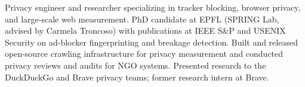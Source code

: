 

\begin{cvparagraph}

Privacy engineer and researcher specializing in tracker blocking, browser privacy, and large-scale web measurement. PhD candidate at EPFL (SPRING Lab, advised by Carmela Troncoso) with publications at IEEE S\&P and USENIX Security on ad-blocker fingerprinting and breakage detection. Built and released open-source crawling infrastructure for privacy measurement and conducted privacy reviews and audits for NGO systems. Presented research to the DuckDuckGo and Brave privacy teams; former research intern at Brave.
\end{cvparagraph}
